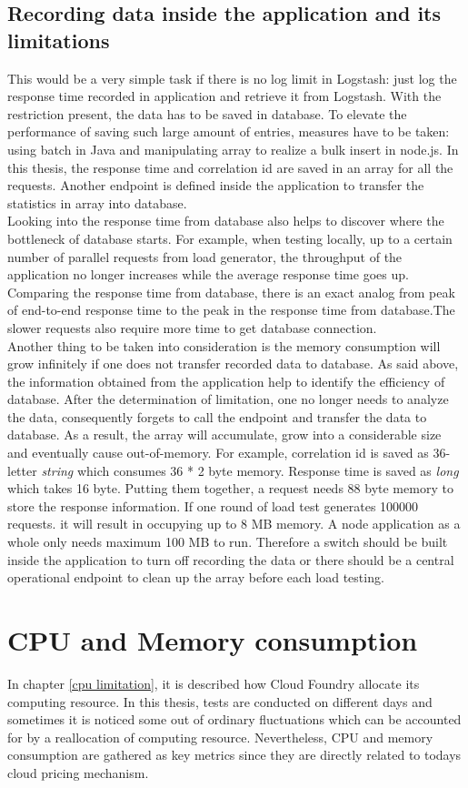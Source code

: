   \subsection{Recording data inside the application and its limitations}
This would be a very simple task if there is no log limit in Logstash: just log the response time recorded in application and retrieve it from Logstash. With the restriction present, the data has to be saved in database. To elevate the performance of saving such large amount of entries, measures have to be taken: using batch in Java and manipulating array to realize a bulk insert in node.js. In this thesis, the response time and correlation id are saved in an array for all the requests. Another endpoint is defined inside the application to transfer the statistics in array into database.\\
Looking into the response time from database also helps to discover where the bottleneck of database starts. For example, when testing locally, up to a certain number of parallel requests from load generator, the throughput of the application no longer increases while the average response time goes up. Comparing the response time from database, there is an exact analog from peak of end-to-end response time to the peak in the response time from database.The slower requests also require more time to get database connection. \\
Another thing to be taken into consideration is the memory consumption will grow infinitely if one does not transfer recorded data to database. As said above, the information obtained from the application help to identify the efficiency of database. After the determination of limitation, one no longer needs to analyze the data,  consequently forgets to call the endpoint and transfer the data to database. As a result, the array will accumulate, grow into a considerable size and eventually cause out-of-memory. For example, correlation id is saved as 36-letter \textit{string} which consumes 36 * 2 byte memory. Response time is saved as \textit{long} which takes 16 byte. Putting them together, a request needs 88 byte memory to store the response information. If one round of load test generates 100000 requests. it will result in occupying up to 8 MB memory. A node application as a whole only needs maximum 100 MB to run. Therefore a switch should be built inside the application to turn off recording the data or there should be a central operational endpoint to clean up the array before each load testing. 
\section{CPU and Memory consumption}
In chapter \ref{cpu limitation}, it is described how Cloud Foundry allocate its computing resource. In this thesis, tests are conducted on different days and sometimes it is noticed some out of ordinary fluctuations which can be accounted for by a reallocation of computing resource. Nevertheless, CPU and memory consumption are gathered as key metrics since they are directly related to todays cloud pricing mechanism.
